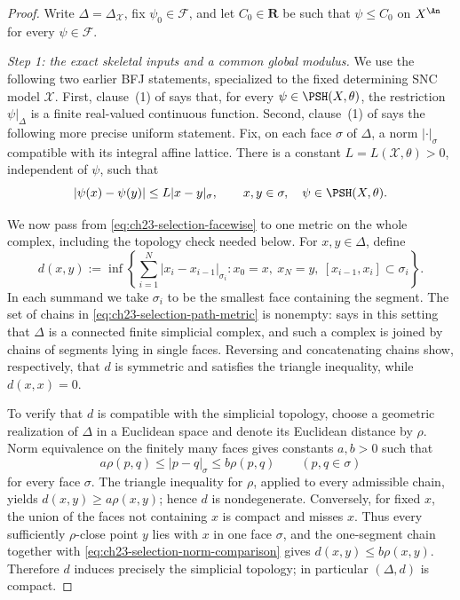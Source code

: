 \begin{proof}
Write $\Delta=\Delta_{\mathcal X}$, fix $\psi_0\in\mathcal F$, and let
$C_0\in\mathbf R$ be such that $\psi\leq C_0$ on $X^{\An}$ for every
$\psi\in\mathcal F$.

\emph{Step 1: the exact skeletal inputs and a common global modulus.}
We use the following two earlier BFJ statements, specialized to the fixed
determining SNC model $\mathcal X$.  First, clause~(1) of
 says that, for every
$\psi\in\PSH(X,\theta)$, the restriction $\psi|_\Delta$ is a finite
real-valued continuous function.  Second, clause~(1) of
 says the following more precise
uniform statement.  Fix, on each face $\sigma$ of $\Delta$, a norm
$|\cdot|_\sigma$ compatible with its integral affine lattice.  There is a
constant $L=L(\mathcal X,\theta)>0$, independent of $\psi$, such that
\begin{equation}\label{eq:ch23-selection-facewise}
 |\psi(x)-\psi(y)|\leq L|x-y|_\sigma,
 \qquad x,y\in\sigma,
 \quad \psi\in\PSH(X,\theta).
\end{equation}

We now pass from \eqref{eq:ch23-selection-facewise} to one metric on the
whole complex, including the topology check needed below.  For
$x,y\in\Delta$, define
\begin{equation}\label{eq:ch23-selection-path-metric}
 d(x,y):=\inf\left\{
   \sum_{i=1}^{N}|x_i-x_{i-1}|_{\sigma_i}:
   x_0=x,\ x_N=y,\ [x_{i-1},x_i]\subset\sigma_i
 \right\}.
\end{equation}
In each summand we take $\sigma_i$ to be the smallest face containing the
segment.  The set of chains in \eqref{eq:ch23-selection-path-metric} is
nonempty:  says in this setting that
$\Delta$ is a connected finite simplicial complex, and such a complex is
joined by chains of segments lying in single faces.  Reversing and
concatenating chains show, respectively, that $d$ is symmetric and
satisfies the triangle inequality, while $d(x,x)=0$.

To verify that $d$ is compatible with the simplicial topology, choose a
geometric realization of $\Delta$ in a Euclidean space and denote its
Euclidean distance by $\rho$.  Norm equivalence on the finitely many faces
gives constants $a,b>0$ such that
\begin{equation}\label{eq:ch23-selection-norm-comparison}
 a\rho(p,q)\leq |p-q|_\sigma\leq b\rho(p,q)
 \qquad(p,q\in\sigma)
\end{equation}
for every face $\sigma$.  The triangle inequality for $\rho$, applied to
every admissible chain, yields $d(x,y)\geq a\rho(x,y)$; hence $d$ is
nondegenerate.  Conversely, for fixed $x$, the union of the faces not
containing $x$ is compact and misses $x$.  Thus every sufficiently
$\rho$-close point $y$ lies with $x$ in one face $\sigma$, and the
one-segment chain together with \eqref{eq:ch23-selection-norm-comparison}
gives $d(x,y)\leq b\rho(x,y)$.  Therefore $d$ induces precisely the
simplicial topology; in particular $(\Delta,d)$ is compact.


\end{proof}
